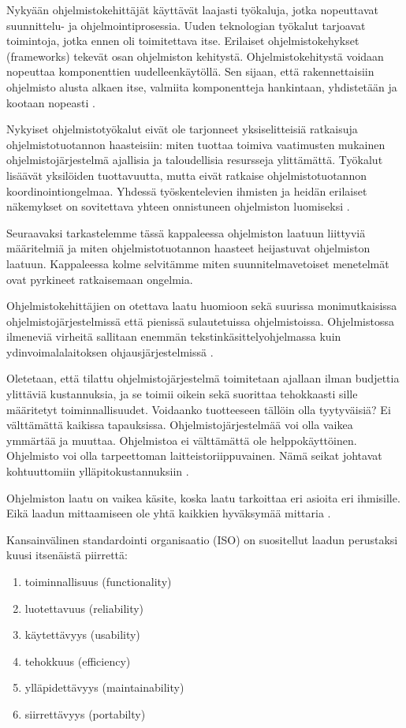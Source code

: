 \documentclass[finnish]{tktltiki2}
\theoremstyle{definition}
\theoremstyle{remark}
\begin{document}
Nykyään ohjelmistokehittäjät käyttävät laajasti työkaluja, jotka nopeuttavat suunnittelu- ja ohjelmointiprosessia. Uuden teknologian työkalut tarjoavat toimintoja, jotka ennen oli toimitettava itse. Erilaiset ohjelmistokehykset (frameworks) tekevät osan ohjelmiston kehitystä. Ohjelmistokehitystä voidaan nopeuttaa komponenttien uudelleenkäytöllä. Sen sijaan, että rakennettaisiin ohjelmisto alusta alkaen itse, valmiita komponentteja hankintaan, yhdistetään ja kootaan nopeasti \cite{BRL03}.

Nykyiset ohjelmistotyökalut eivät ole tarjonneet yksiselitteisiä ratkaisuja ohjelmistotuotannon haasteisiin: miten tuottaa toimiva vaatimusten mukainen ohjelmistojärjestelmä ajallisia ja taloudellisia resursseja ylittämättä. Työkalut lisäävät yksilöiden tuottavuutta, mutta eivät ratkaise ohjelmistotuotannon koordinointiongelmaa. Yhdessä työskentelevien ihmisten ja heidän erilaiset näkemykset on sovitettava yhteen onnistuneen ohjelmiston luomiseksi \cite{KES95}.

Seuraavaksi tarkastelemme tässä kappaleessa ohjelmiston laatuun liittyviä määritelmiä ja miten ohjelmistotuotannon haasteet heijastuvat ohjelmiston laatuun. Kappaleessa kolme selvitämme miten suunnitelmavetoiset menetelmät ovat pyrkineet ratkaisemaan ongelmia.

Ohjelmistokehittäjien on otettava laatu huomioon sekä suurissa monimutkaisissa ohjelmistojärjestelmissä että pienissä sulautetuissa ohjelmistoissa. Ohjelmistossa ilmeneviä virheitä sallitaan enemmän tekstinkäsittelyohjelmassa kuin ydinvoimalalaitoksen ohjausjärjestelmissä \cite{KIP96}.

Oletetaan, että tilattu ohjelmistojärjestelmä toimitetaan ajallaan ilman budjettia ylittäviä kustannuksia, ja se toimii oikein sekä suorittaa tehokkaasti sille määritetyt toiminnallisuudet. Voidaanko tuotteeseen tällöin olla tyytyväisiä? Ei välttämättä kaikissa tapauksissa. Ohjelmistojärjestelmää voi olla vaikea ymmärtää ja muuttaa. Ohjelmistoa ei välttämättä ole helppokäyttöinen. Ohjelmisto voi olla tarpeettoman laitteistoriippuvainen. Nämä seikat johtavat kohtuuttomiin ylläpitokustannuksiin \cite{BBL76}.

Ohjelmiston laatu on vaikea käsite, koska laatu tarkoittaa eri asioita eri ihmisille. Eikä laadun mittaamiseen ole yhtä kaikkien hyväksymää mittaria \cite{KIP96}.        

Kansainvälinen standardointi organisaatio (ISO) on suositellut laadun perustaksi kuusi itsenäistä piirrettä:

\begin{enumerate}
  \item toiminnallisuus (functionality)
  \item luotettavuus (reliability)
  \item käytettävyys (usability)
  \item tehokkuus (efficiency)
  \item ylläpidettävyys (maintainability)
  \item siirrettävyys (portabilty) \cite{KIP96}
\end{enumerate}
\end{document}
